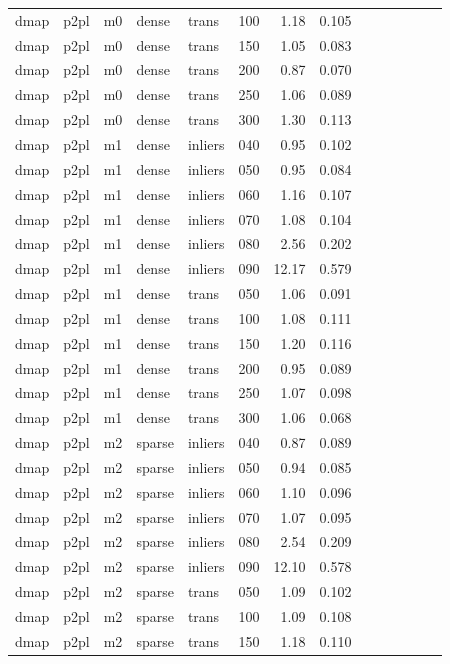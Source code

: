 \begin{table}[htbp]
\begin{tabular}{llllllrrrrrrrr}
  dmap & p2pl & m0 & dense & trans & 100 & 1.18 & 0.105 \\
  dmap & p2pl & m0 & dense & trans & 150 & 1.05 & 0.083 \\
  dmap & p2pl & m0 & dense & trans & 200 & 0.87 & 0.070 \\
  dmap & p2pl & m0 & dense & trans & 250 & 1.06 & 0.089 \\
  dmap & p2pl & m0 & dense & trans & 300 & 1.30 & 0.113 \\
  dmap & p2pl & m1 & dense & inliers & 040 & 0.95 & 0.102 \\
  dmap & p2pl & m1 & dense & inliers & 050 & 0.95 & 0.084 \\
  dmap & p2pl & m1 & dense & inliers & 060 & 1.16 & 0.107 \\
  dmap & p2pl & m1 & dense & inliers & 070 & 1.08 & 0.104 \\
  dmap & p2pl & m1 & dense & inliers & 080 & 2.56 & 0.202 \\
  dmap & p2pl & m1 & dense & inliers & 090 & 12.17 & 0.579 \\
  dmap & p2pl & m1 & dense & trans & 050 & 1.06 & 0.091 \\
  dmap & p2pl & m1 & dense & trans & 100 & 1.08 & 0.111 \\
  dmap & p2pl & m1 & dense & trans & 150 & 1.20 & 0.116 \\
  dmap & p2pl & m1 & dense & trans & 200 & 0.95 & 0.089 \\
  dmap & p2pl & m1 & dense & trans & 250 & 1.07 & 0.098 \\
  dmap & p2pl & m1 & dense & trans & 300 & 1.06 & 0.068 \\
  dmap & p2pl & m2 & sparse & inliers & 040 & 0.87 & 0.089 \\
  dmap & p2pl & m2 & sparse & inliers & 050 & 0.94 & 0.085 \\
  dmap & p2pl & m2 & sparse & inliers & 060 & 1.10 & 0.096 \\
  dmap & p2pl & m2 & sparse & inliers & 070 & 1.07 & 0.095 \\
  dmap & p2pl & m2 & sparse & inliers & 080 & 2.54 & 0.209 \\
  dmap & p2pl & m2 & sparse & inliers & 090 & 12.10 & 0.578 \\
  dmap & p2pl & m2 & sparse & trans & 050 & 1.09 & 0.102 \\
  dmap & p2pl & m2 & sparse & trans & 100 & 1.09 & 0.108 \\
  dmap & p2pl & m2 & sparse & trans & 150 & 1.18 & 0.110 \\

\end{tabular}
\end{table}
